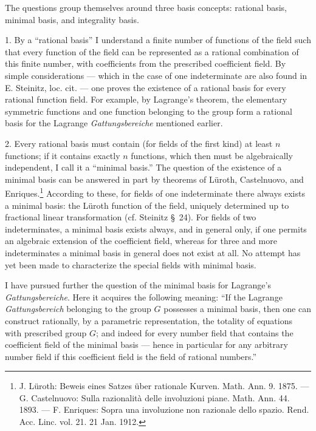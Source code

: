 \documentclass[11pt]{article}
\begin{document}
The questions group themselves around three basis concepts: rational basis, minimal basis, and integrality basis.

1. By a ``rational basis'' I understand a finite number of functions of the field such that every function of the field can be represented as a rational combination of this finite number, with coefficients from the prescribed coefficient field. By simple considerations --- which in the case of one indeterminate are also found in E. Steinitz, loc. cit. --- one proves the existence of a rational basis for every rational function field. For example, by Lagrange's theorem, the elementary symmetric functions and one function belonging to the group form a rational basis for the Lagrange \emph{Gattungsbereiche} mentioned earlier.

2. Every rational basis must contain (for fields of the first kind) at least $n$ functions; if it contains exactly $n$ functions, which then must be algebraically independent, I call it a ``minimal basis.'' The question of the existence of a minimal basis can be answered in part by theorems of Lüroth, Castelnuovo, and Enriques.\footnote{J. Lüroth: Beweis eines Satzes über rationale Kurven. Math. Ann. 9. 1875. --- G. Castelnuovo: Sulla razionalità delle involuzioni piane. Math. Ann. 44. 1893. --- F. Enriques: Sopra una involuzione non razionale dello spazio. Rend. Acc. Linc. vol. 21. 21 Jan. 1912.} According to these, for fields of one indeterminate there always exists a minimal basis: the Lüroth function of the field, uniquely determined up to fractional linear transformation (cf. Steinitz \S\ 24). For fields of two indeterminates, a minimal basis exists always, and in general only, if one permits an algebraic extension of the coefficient field, whereas for three and more indeterminates a minimal basis in general does not exist at all. No attempt has yet been made to characterize the special fields with minimal basis.

I have pursued further the question of the minimal basis for Lagrange's \emph{Gattungsbereiche}. Here it acquires the following meaning: ``If the Lagrange \emph{Gattungsbereich} belonging to the group $G$ possesses a minimal basis, then one can construct rationally, by a parametric representation, the totality of equations with prescribed group $G$; and indeed for every number field that contains the coefficient field of the minimal basis --- hence in particular for any arbitrary number field if this coefficient field is the field of rational numbers.''
\end{document}

